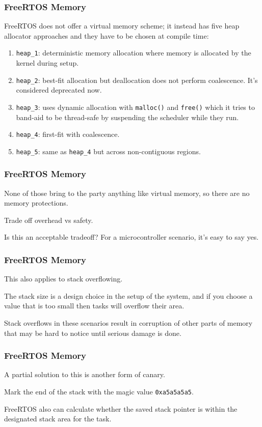 \begin{frame}
\frametitle{FreeRTOS Memory}

FreeRTOS does not offer a virtual memory scheme; it instead has five heap allocator approaches and they have to be chosen at compile time:

\begin{enumerate}
	\item \texttt{heap\_1}: deterministic memory allocation where memory is allocated by the kernel during setup.
	\item \texttt{heap\_2}: best-fit allocation but deallocation does not perform coalescence. It's considered deprecated now.
	\item \texttt{heap\_3}: uses dynamic allocation with \texttt{malloc()} and \texttt{free()} which it tries to band-aid to be thread-safe by suspending the scheduler while they run.
	\item \texttt{heap\_4}: first-fit with coalescence.
	\item \texttt{heap\_5}: same as \texttt{heap\_4} but across non-contiguous regions.
\end{enumerate}


\end{frame}


\begin{frame}
\frametitle{FreeRTOS Memory}

None of those bring to the party anything like virtual memory, so there are no memory protections.

Trade off overhead vs safety.

Is this an acceptable tradeoff? For a microcontroller scenario, it's easy to say yes.

\end{frame}


\begin{frame}
\frametitle{FreeRTOS Memory}

This also applies to stack overflowing. 

The stack size is a design choice in the setup of the system, and if you choose a value that is too small then tasks will overflow their area. 

Stack overflows in these scenarios result in corruption of other parts of memory that may be hard to notice until serious damage is done. 

\end{frame}


\begin{frame}
\frametitle{FreeRTOS Memory}

A partial solution to this is another form of canary.

Mark the end of the stack with the magic value \texttt{0xa5a5a5a5}.

FreeRTOS also can calculate whether the saved stack pointer is within the designated stack area for the task.

\end{frame}



